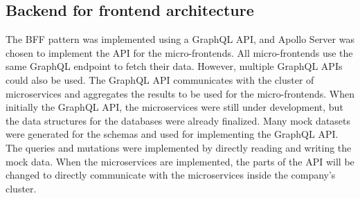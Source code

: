 \subsection{Backend for frontend architecture}\label{subsection:background:prototypical-implemenation:bff}

The \ac{BFF} pattern was implemented using a GraphQL \ac{API}, and Apollo Server was chosen to implement the \ac{API} for the micro-frontends. All micro-frontends use the same GraphQL endpoint to fetch their data. However, multiple GraphQL \acp{API} could also be used. The GraphQL \ac{API} communicates with the cluster of microservices and aggregates the results to be used for the micro-frontends. When initially the GraphQL \ac{API}, the microservices were still under development, but the data structures for the databases were already finalized. Many mock datasets were generated for the schemas and used for implementing the GraphQL \ac{API}. The queries and mutations were implemented by directly reading and writing the mock data. When the microservices are implemented, the parts of the \ac{API} will be changed to directly communicate with the microservices inside the company's cluster.

